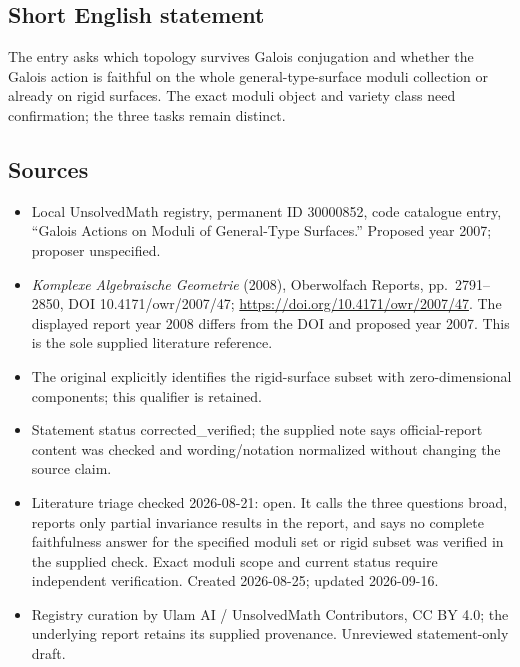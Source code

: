 \documentclass[11pt]{article}
\begin{document}
\subsection{Short English statement}
The entry asks which topology survives Galois conjugation and whether the Galois action is faithful on the whole general-type-surface moduli collection or already on rigid surfaces. The exact moduli object and variety class need confirmation; the three tasks remain distinct.
\subsection{Sources}
\begin{itemize}
\item Local UnsolvedMath registry, permanent ID 30000852, code catalogue entry, ``Galois Actions on Moduli of General-Type Surfaces.'' Proposed year 2007; proposer unspecified.
\item \emph{Komplexe Algebraische Geometrie} (2008), Oberwolfach Reports, pp.\ 2791--2850, DOI 10.4171/owr/2007/47; \url{https://doi.org/10.4171/owr/2007/47}. The displayed report year 2008 differs from the DOI and proposed year 2007. This is the sole supplied literature reference.
\item The original explicitly identifies the rigid-surface subset with zero-dimensional components; this qualifier is retained.
\item Statement status corrected\_verified; the supplied note says official-report content was checked and wording/notation normalized without changing the source claim.
\item Literature triage checked 2026-08-21: open. It calls the three questions broad, reports only partial invariance results in the report, and says no complete faithfulness answer for the specified moduli set or rigid subset was verified in the supplied check. Exact moduli scope and current status require independent verification. Created 2026-08-25; updated 2026-09-16.
\item Registry curation by Ulam AI / UnsolvedMath Contributors, CC BY 4.0; the underlying report retains its supplied provenance. Unreviewed statement-only draft.
\end{itemize}
\end{document}
